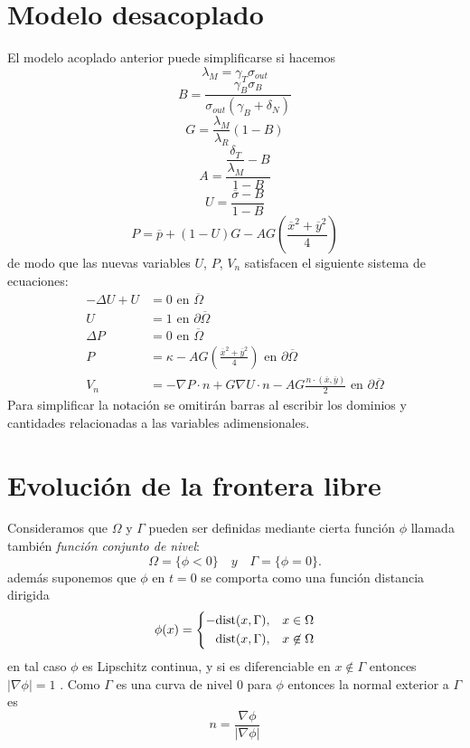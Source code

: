 \section{Modelo desacoplado}
El modelo acoplado anterior puede simplificarse si hacemos 
\begin{equation}
	\lambda_M= \gamma_T \sigma_{out}
\end{equation}
\begin{equation}
	B=\frac{\gamma_B\sigma_B}{\sigma_{out}(\gamma_B + \delta_N)}
\end{equation}
\begin{equation} 
	G=\frac{\lambda_M}{\lambda_R}(1-B)
	\label{eqn:G}
\end{equation}
\begin{equation}
	A=\frac{\dfrac{\delta_T}{\lambda_M}-B}{1-B}
	\label{eqn:A}
\end{equation}
\begin{equation}
	U=\frac{ \overline{\sigma}-B }{1-B}
\end{equation}
\begin{equation}
	P=\overline{p} + (1-U)G- AG\left( \frac{\overline{x}^2+\overline{y}^2}{4}\right)
\end{equation}
de modo que las nuevas variables $U$, $P$, $V_n$ satisfacen el siguiente sistema de ecuaciones:
\begin{align}
	-\Delta U + U  &= 0 \text{ en }  \overline{\Omega}\\
	U &= 1 	 \text{ en }  \partial \overline{\Omega}\\
	\Delta P  &= 0 \text{ en }  \overline{\Omega}\\
	P &= \kappa - AG\left( \frac{\overline{x}^2+\overline{y}^2}{4} \right)	 \text{ en }  \partial \overline{\Omega}\\
	V_n& =-\nabla P \cdot n + G \nabla U \cdot n- AG \frac{n\cdot (\overline{x},\overline{y})}{2} \text{ en }  \partial \overline{\Omega} \label{eqn:velocidadVn}
\end{align}	
Para simplificar la notación se omitirán  barras al escribir los dominios y cantidades relacionadas a las variables adimensionales.

\section{Evolución de la frontera libre}
Consideramos que $\Omega$ y $\Gamma$ pueden ser definidas mediante cierta función $\phi$ llamada también \emph{función conjunto de nivel}:
\[
\Omega = \{ \phi<0\}\quad y \quad  \Gamma
=\{ \phi =0\}.
\]
además suponemos que $\phi$ en $t=0$ se comporta como una función distancia dirigida 
\[
\phi(x)=
\left\{
\begin{aligned}
	-{\rm dist}(x,\Gamma)&,&x\in\Omega\\
	{\rm dist}(x,\Gamma)&,&x\not\in\Omega
\end{aligned}
\right.
\]
en tal caso $\phi$ es Lipschitz continua, y si es diferenciable en $x\not \in \Gamma$ entonces $|\nabla \phi|=1$ \citep{delfour1994shape}. Como $\Gamma$ es una  curva de nivel 0 para $\phi$ entonces la normal exterior a $\Gamma$ es
\[
n = \frac{\nabla \phi}{|\nabla \phi|}
\]

